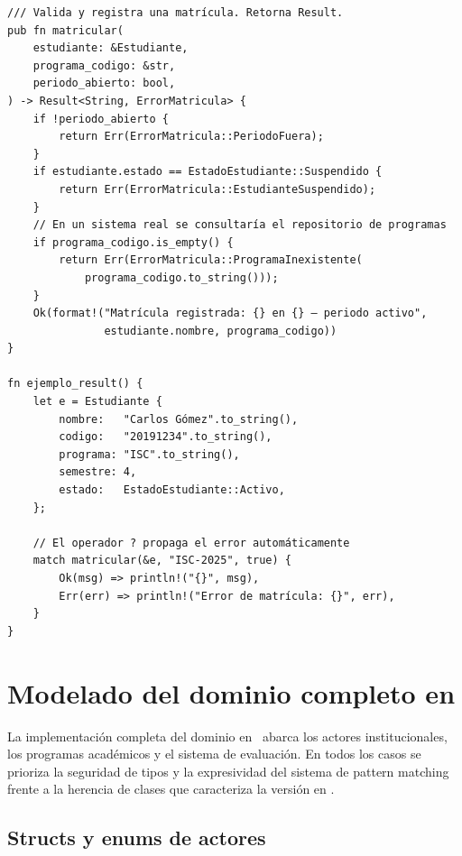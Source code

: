 \begin{lstlisting}[style=rustStyle, caption={Pattern matching con \texttt{Option} y \texttt{Result}}, label={lst:pattern-matching}]
/// Valida y registra una matrícula. Retorna Result.
pub fn matricular(
    estudiante: &Estudiante,
    programa_codigo: &str,
    periodo_abierto: bool,
) -> Result<String, ErrorMatricula> {
    if !periodo_abierto {
        return Err(ErrorMatricula::PeriodoFuera);
    }
    if estudiante.estado == EstadoEstudiante::Suspendido {
        return Err(ErrorMatricula::EstudianteSuspendido);
    }
    // En un sistema real se consultaría el repositorio de programas
    if programa_codigo.is_empty() {
        return Err(ErrorMatricula::ProgramaInexistente(
            programa_codigo.to_string()));
    }
    Ok(format!("Matrícula registrada: {} en {} — periodo activo",
               estudiante.nombre, programa_codigo))
}

fn ejemplo_result() {
    let e = Estudiante {
        nombre:   "Carlos Gómez".to_string(),
        codigo:   "20191234".to_string(),
        programa: "ISC".to_string(),
        semestre: 4,
        estado:   EstadoEstudiante::Activo,
    };

    // El operador ? propaga el error automáticamente
    match matricular(&e, "ISC-2025", true) {
        Ok(msg) => println!("{}", msg),
        Err(err) => println!("Error de matrícula: {}", err),
    }
}
\end{lstlisting}

\section{Modelado del dominio completo en \rust}
\label{sec:rust-dominio}

\noindent
La implementación completa del dominio en \rust\ abarca los actores institucionales,
los programas académicos y el sistema de evaluación. En todos los casos se prioriza
la seguridad de tipos y la expresividad del sistema de pattern matching frente a la
herencia de clases que caracteriza la versión en \java.

\subsection{Structs y enums de actores}
\label{subsec:rust-actores}

